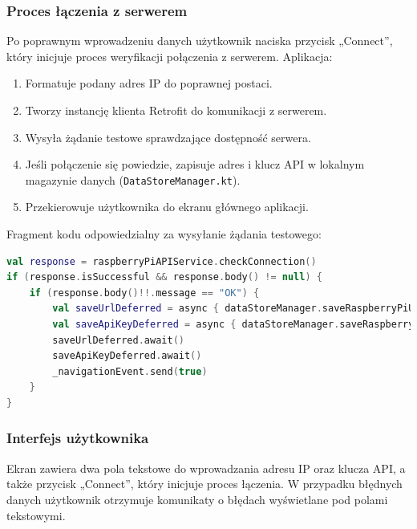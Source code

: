 \documentclass[12pt]{article}
\begin{document}
\subsubsection*{Proces łączenia z serwerem}
\noindent Po poprawnym wprowadzeniu danych użytkownik naciska przycisk „Connect”, który inicjuje proces weryfikacji połączenia z serwerem. Aplikacja:
\begin{enumerate}
    \item Formatuje podany adres IP do poprawnej postaci.
    \item Tworzy instancję klienta Retrofit do komunikacji z serwerem.
    \item Wysyła żądanie testowe sprawdzające dostępność serwera.
    \item Jeśli połączenie się powiedzie, zapisuje adres i klucz API w lokalnym magazynie danych (\texttt{DataStoreManager.kt}).
    \item Przekierowuje użytkownika do ekranu głównego aplikacji.
\end{enumerate}

\noindent Fragment kodu odpowiedzialny za wysyłanie żądania testowego:
\begin{lstlisting}[language=Kotlin]
val response = raspberryPiAPIService.checkConnection()
if (response.isSuccessful && response.body() != null) {
    if (response.body()!!.message == "OK") {
        val saveUrlDeferred = async { dataStoreManager.saveRaspberryPiUrl(formattedRaspberryUrl) }
        val saveApiKeyDeferred = async { dataStoreManager.saveRaspberryPiApiKey(apiKey) }
        saveUrlDeferred.await()
        saveApiKeyDeferred.await()
        _navigationEvent.send(true)
    }
}
\end{lstlisting}

\subsubsection*{Interfejs użytkownika}
\noindent Ekran zawiera dwa pola tekstowe do wprowadzania adresu IP oraz klucza API, a także przycisk „Connect”, który inicjuje proces łączenia. W przypadku błędnych danych użytkownik
otrzymuje komunikaty o błędach wyświetlane pod polami tekstowymi.
\end{document}
